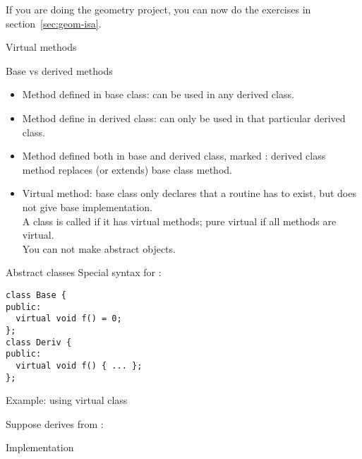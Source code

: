\begin{exercise}
  If you are doing the geometry project, 
  you can now do the exercises in section~\ref{sec:geom-isa}.
\end{exercise}

 {Virtual methods}

\begin{block}{Base vs derived methods}
  \begin{itemize}
  \item Method defined in base class: can be used in any derived class.
  \item Method define in derived class: can only be used in that
    particular derived class.
  \item Method defined both in base and derived class, marked
    : derived class method replaces (or extends)
    base class method.
  \item Virtual method: base class only declares that a routine has to
    exist, but does not give base implementation.\\ A class is called
     if it has virtual methods; pure
    virtual if all methods are virtual.\\ You can not make abstract objects.
  \end{itemize}  
\end{block}

\begin{block}{Abstract classes}
  Special syntax for :
\begin{verbatim}
class Base {
public:
  virtual void f() = 0;
};
class Deriv {
public:
  virtual void f() { ... };
};
\end{verbatim}
\end{block}

\begin{block}{Example: using virtual class}
  \small
  \begin{multicols}{2}
    \vfill\columnbreak
    Suppose  derives from :\\
  \end{multicols}
\end{block}

\begin{block}{Implementation}
  \footnotesize
  \begin{multicols}{2}
    \vfill\columnbreak
  \end{multicols}
\end{block}

